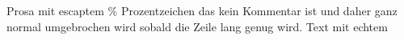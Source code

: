 Prosa mit escaptem \% Prozentzeichen das kein Kommentar ist und daher ganz normal umgebrochen wird
sobald die Zeile lang genug wird.
Text mit echtem %
